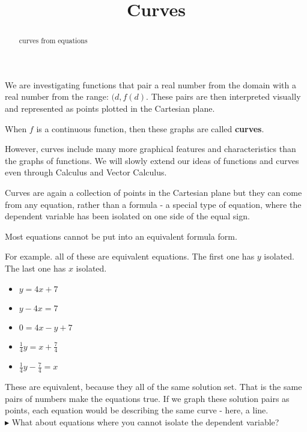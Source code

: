 \documentclass{ximera}
\title{Curves}
\begin{document}
\begin{abstract}
curves from equations
\end{abstract}
\maketitle





We are investigating functions that pair a real number from the domain with a real number from the range: $(d, f(d)$.  These pairs are then interpreted visually and represented as points plotted in the Cartesian plane.

When $f$ is a continuous function, then these graphs are called \textbf{curves}.



However, curves include many more graphical features and characteristics than the graphs of functions.  We will slowly extend our ideas of functions and curves even through Calculus and Vector Calculus.

Curves are again a collection of points in the Cartesian plane but they can come from any equation, rather than a formula - a special type of equation, where the dependent variable has been isolated on one side of the equal sign.


Most equations cannot be put into an equivalent formula form.



For example. all of these are equivalent equations.  The first one has $y$ isolated.  The last one has $x$ isolated.


\begin{itemize}
\item $y = 4 x + 7$
\item $y - 4x = 7$
\item $0 = 4x - y + 7$
\item $\frac{1}{4}y = x + \frac{7}{4}$
\item $\frac{1}{4}y - \frac{7}{4}= x$
\end{itemize}


These are equivalent, because they all of the same solution set.  That is the same pairs of numbers make the equations true.  If we graph these solution pairs as points, each equation would be describing the same curve - here, a line. \\



$\blacktriangleright$ What about equations where you cannot isolate the dependent variable? \\
\end{document}
